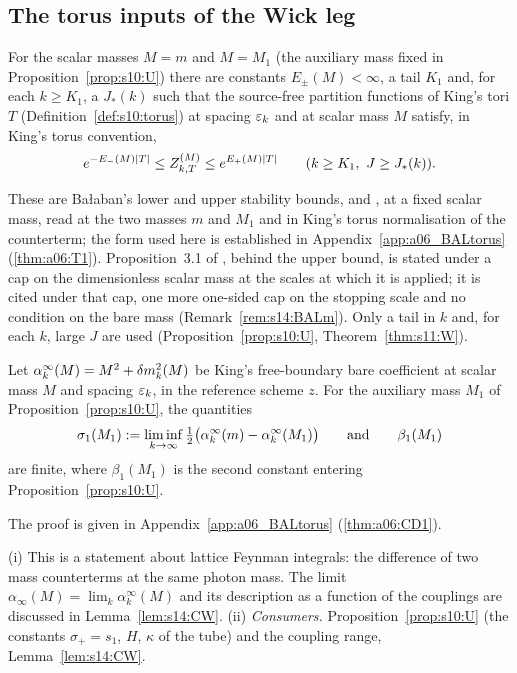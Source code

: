 \subsection{The torus inputs of the Wick leg}

\begin{proposition}\label{hyp:s03:T1}
For the scalar masses $M=m$ and $M=M_1$ (the auxiliary mass fixed in Proposition~\ref{prop:s10:U}) there are constants $E_\pm(M)<\infty$, a tail $K_1$ and, for each $k\ge K_1$, a $J_*(k)$ such that the source-free partition functions of King's tori $T$ (Definition~\ref{def:s10:torus}) at spacing $\varepsilon_k$ and at scalar mass $M$ satisfy, in King's torus convention,
\[
e^{-E_-(M)\lvert T\rvert}\le Z^{(M)}_{k,T}\le e^{E_+(M)\lvert T\rvert}\qquad(k\ge K_1,\ J\ge J_*(k)).
\]
\end{proposition}
These are Ba{\l}aban's lower and upper stability bounds, \cite[(1.14)]{Ba1} and \cite[(1.3)]{Ba2}, at a fixed scalar mass, read at the two masses $m$ and $M_1$ and in King's torus normalisation of the counterterm; the form used here is established in Appendix~\ref{app:a06_BALtorus} (\cref{thm:a06:T1}). Proposition~3.1 of \cite{Ba2}, behind the upper bound, is stated under a cap on the dimensionless scalar mass at the scales at which it is applied; it is cited under that cap, one more one-sided cap on the stopping scale and no condition on the bare mass (Remark~\ref{rem:s14:BALm}). Only a tail in $k$ and, for each $k$, large $J$ are used (Proposition~\ref{prop:s10:U}, Theorem~\ref{thm:s11:W}).

\begin{lemma}\label{hyp:s03:T2}
Let $\alpha^\infty_k(M)=M^2+\delta m^2_k(M)$ be King's free-boundary bare coefficient at scalar mass $M$ and spacing $\varepsilon_k$, in the reference scheme $z$. For the auxiliary mass $M_1$ of Proposition~\ref{prop:s10:U}, the quantities
\[
\sigma_1(M_1):=\liminf_{k\to\infty}\tfrac12\bigl(\alpha^\infty_k(m)-\alpha^\infty_k(M_1)\bigr)
\qquad\text{and}\qquad \beta_1(M_1)
\]
are finite, where $\beta_1(M_1)$ is the second constant entering Proposition~\ref{prop:s10:U}.
\end{lemma}
The proof is given in Appendix~\ref{app:a06_BALtorus} (\cref{thm:a06:CD1}).

\begin{remark}\label{rem:s03:T2}
(i) This is a statement about lattice Feynman integrals: the difference of two mass counterterms at the same photon mass. The limit $\alpha_\infty(M)=\lim_k\alpha^\infty_k(M)$ and its description as a function of the couplings are discussed in Lemma~\ref{lem:s14:CW}.
(ii) \emph{Consumers.} Proposition~\ref{prop:s10:U} (the constants $\sigma_+=s_1$, $H$, $\kappa$ of the tube) and the coupling range, Lemma~\ref{lem:s14:CW}.
\end{remark}

